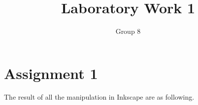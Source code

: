 \documentclass[11pt]{article}
\begin{document}
\author{Group 8}
\title{Laboratory Work 1}
\maketitle

\section{Assignment 1}
The result of all the manipulation in Inkscape are as following.

\end{document}
